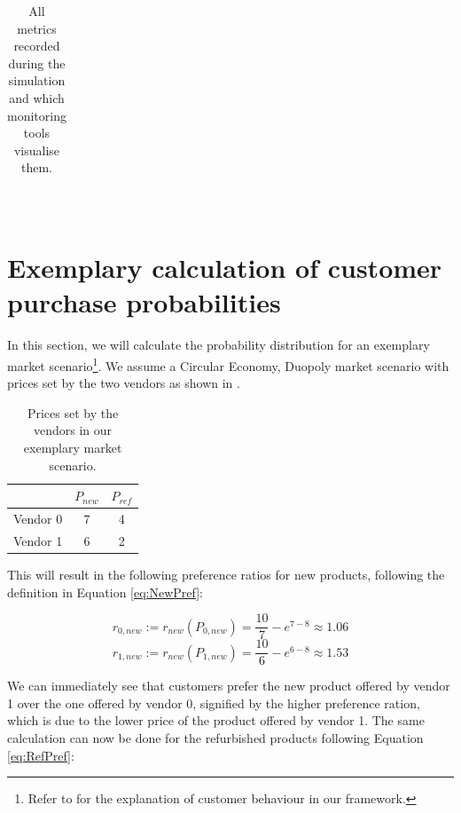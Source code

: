\begin{table}[!]
\begin{tabular}{|cr|p{2.2mm}|p{2.2mm}|p{2.2mm}|p{2.2mm}|p{2.2mm}|p{2.2mm}|p{2.2mm}|p{2.2mm}|p{2.2mm}|p{2.2mm}|p{2.2mm}|p{2.2mm}|p{2.2mm}|p{2.2mm}|p{2.2mm}|p{2.2mm}|}
	\end{tabular}\\
	\caption{All metrics recorded during the simulation and which monitoring tools visualise them.}\label{tab:AllMetrics}
\end{table}

\newpage

\section{Exemplary calculation of customer purchase probabilities}\label{sec:customerPropExample}

In this section, we will calculate the probability distribution for an exemplary market scenario\footnote{Refer to  for the explanation of customer behaviour in our framework.}. We assume a Circular Economy, Duopoly market scenario with prices set by the two vendors as shown in .

\begin{table}[!htb]
	\begin{tabular}{|r|c|c|}
		\hline
		         & \(P_{new}\) & \(P_{ref}\) \\\hline
		Vendor 0 & 7           & 4           \\\hline
		Vendor 1 & 6           & 2           \\\hline
	\end{tabular}\medskip
	\caption{Prices set by the vendors in our exemplary market scenario.}\label{tab:CustomerExamplePrices}
\end{table}

\noindent This will result in the following preference ratios for new products, following the definition in Equation \eqref{eq:NewPref}:

\begin{equation}
	r_{0,new} := r_{new}(P_{0,new}) = \frac{10}{7} - e^{7 - 8} \approx 1.06
\end{equation}
\begin{equation}
	r_{1,new} := r_{new}(P_{1,new}) = \frac{10}{6} - e^{6 - 8} \approx 1.53
\end{equation}

We can immediately see that customers prefer the new product offered by vendor 1 over the one offered by vendor 0, signified by the higher preference ration, which is due to the lower price of the product offered by vendor 1. The same calculation can now be done for the refurbished products following Equation \eqref{eq:RefPref}:

